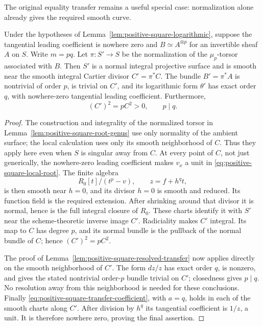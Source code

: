 The original equality transfer remains a useful special case:
normalization alone already gives the required smooth curve.

\begin{lemma}\label{lem:positive-square-root-transfer}
Under the hypotheses of Lemma~\ref{lem:positive-square-logarithmic},
suppose the tangential leading coefficient is nowhere zero and
$B\simeq A^{\otimes p}$ for an invertible sheaf $A$ on $S$.
Write $m=pq$. Let $\pi:S'\to S$ be the normalization of the
$\mu_p$-torsor associated with $B$.
Then $S'$ is a normal integral projective surface and is smooth
near the smooth integral Cartier divisor $C'=\pi^*C$.
The bundle $B'=\pi^*A$ is nontrivial of order $p$, is trivial on
$C'$, and its logarithmic form $\theta'$ has exact order $q$,
with nowhere-zero tangential leading coefficient. Furthermore,
\[
 (C')^2=pC^2>0,\qquad p\mid q.
\]
\end{lemma}

\begin{proof}
The construction and integrality of the normalized torsor in
Lemma~\ref{lem:positive-square-root-genus} use only normality of
the ambient surface; the local calculation uses only its smooth
neighborhood of $C$. Thus they apply here even when $S$ is singular
away from $C$. At every point of $C$, not just generically, the
nowhere-zero leading coefficient makes $v_x$ a unit in
\eqref{eq:positive-square-local-root}. The finite algebra
\[
 R_0[t]/(t^p-v),\qquad z=f+h^qt,
\]
is then smooth near $h=0$, and its divisor $h=0$ is smooth and
reduced. Its function field is the required extension. After
shrinking around that divisor it is normal, hence is the full
integral closure of $R_0$. These charts identify it with $S'$
near the scheme-theoretic inverse image $C'$. Radiciality makes
$C'$ integral. Its map to $C$ has degree $p$, and its normal
bundle is the pullback of the normal bundle of $C$; hence
$(C')^2=pC^2$.

The proof of Lemma~\ref{lem:positive-square-resolved-transfer}
now applies directly on the smooth neighborhood of $C'$.
The form $dz/z$ has exact order $q$, is nonzero, and gives the
stated nontrivial order-$p$ bundle trivial on $C'$; closedness
gives $p\mid q$. No resolution away from this neighborhood is
needed for these conclusions. Finally
\eqref{eq:positive-square-transfer-coefficient}, with $a=q$,
holds in each of the smooth charts along $C'$. After division by
$h^q$ its tangential coefficient is $1/z$, a unit. It is therefore
nowhere zero, proving the final assertion.
\end{proof}

